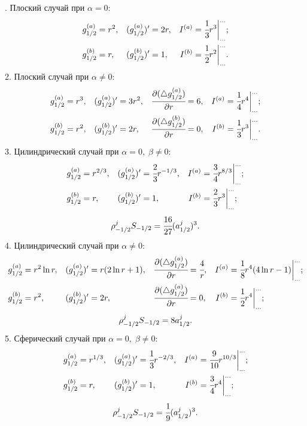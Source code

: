 . Плоский случай при $\alpha = 0$:
\multeqstart
\begin{align*}
	g_{1/2}^{(a)} &= r^2, & (g_{1/2}^{(a)})' &= 2r, & I^{(a)} &= \cfrac{1}{3} r^3 {\bigg|_{...}^{...}} {\text{;}} \\
	g_{1/2}^{(b)} &= r, & (g_{1/2}^{(b)})' &= 1, & I^{(b)} &= \cfrac{1}{2} r^2 {\bigg|_{...}^{...}} {\text{.}}
\end{align*}
2. Плоский случай при $\alpha \neq 0$:
\begin{align*}
	g_{1/2}^{(a)} &= r^3, & (g_{1/2}^{(a)})' &= 3r^2, & \cfrac{\partial (\triangle g_{1/2}^{(a)})}{\partial r} &= 6, & I^{(a)} &= \cfrac{1}{4} r^4 {\bigg|_{...}^{...}} {\text{;}} \\
	g_{1/2}^{(b)} &= r^2, & (g_{1/2}^{(b)})' &= 2r, & \cfrac{\partial (\triangle g_{1/2}^{(b)})}{\partial r} &= 0, & I^{(b)} &= \cfrac{1}{3} r^3 {\bigg|_{...}^{...}} {\text{.}}
\end{align*}
3. Цилиндрический случай при $\alpha = 0, \; \beta \neq 0$:
\begin{align*}
g_{1/2}^{(a)} &= r^{2/3}, & (g_{1/2}^{(a)})' &= \cfrac{2}{3} r^{-1/3}, & I^{(a)} &= \cfrac{3}{4} r^{8/3} {\bigg|_{...}^{...}} {\text{;}} \\
g_{1/2}^{(b)} &= r, & (g_{1/2}^{(b)})' &= 1, & I^{(b)} &= \cfrac{2}{3} r^3 {\bigg|_{...}^{...}} {\text{;}}
\end{align*}
\multeqnext
$$\rho_{-1/2}^j S_{-1/2} = \cfrac{16}{27} (a_{1/2}^j)^3 {\text{.}}$$
4. Цилиндрический случай при $\alpha \neq 0$:
\begin{align*}
	g_{1/2}^{(a)} &= r^2 \ln r, & (g_{1/2}^{(a)})' &= r (2 \ln r + 1), & \cfrac{\partial (\triangle g_{1/2}^{(a)})}{\partial r} &= \cfrac{4}{r}, & I^{(a)} &= \cfrac{1}{8} r^4 (4 \ln r - 1) {\bigg|_{...}^{...}} {\text{;}} \\
	g_{1/2}^{(b)} &= r^2, & (g_{1/2}^{(b)})' &= 2r, & \cfrac{\partial (\triangle g_{1/2}^{(a)})}{\partial r} &= 0, & I^{(b)} &= \cfrac{1}{2} r^4 {\bigg|_{...}^{...}} {\text{;}}
\end{align*}
\multeqnext
$$\rho_{-1/2}^j S_{-1/2} = 8 a_{1/2}^j {\text{.}}$$
5. Сферический случай при $\alpha = 0, \; \beta \neq 0$:
\begin{align*}
	g_{1/2}^{(a)} &= r^{1/3}, & (g_{1/2}^{(a)})' &= \cfrac{1}{3} r^{-2/3}, & I^{(a)} &= \cfrac{9}{10} r^{10/3} {\bigg|_{...}^{...}}  {\text{;}} \\
	g_{1/2}^{(b)} &= r, & (g_{1/2}^{(b)})' &= 1, & I^{(b)} &= \cfrac{3}{4} r^4 {\bigg|_{...}^{...}} {\text{;}}
\end{align*}
\multeqnext
$$\rho_{-1/2}^j S_{-1/2} = \cfrac{1}{9} (a_{1/2}^j)^3 {\text{.}}$$
\multeqfinish